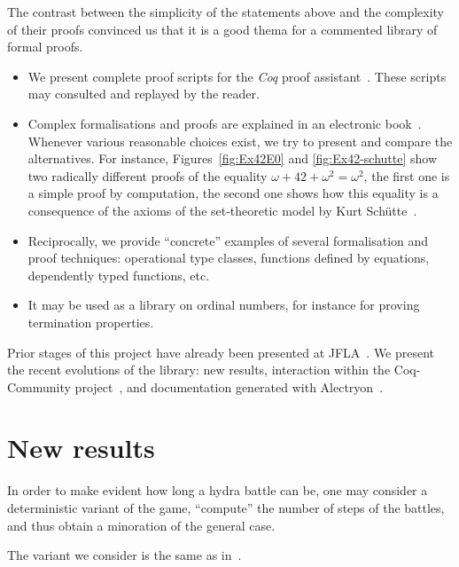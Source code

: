 \documentclass{easychair}
\begin{document}
The contrast between the simplicity of the statements above and the complexity of their proofs convinced us that it is a good thema for a commented library of formal proofs.


\begin{itemize}
\item We present complete proof scripts for the \textit{Coq} proof assistant~\cite{Coq}. These scripts may consulted and replayed by the reader.
\item Complex formalisations and proofs are explained in an
  electronic book~\cite{HydraBook}. Whenever various reasonable choices exist, we try to present and compare the alternatives.
  For instance, Figures~\vref{fig:Ex42E0} and \vref{fig:Ex42-schutte} show two radically different proofs of the equality
  $\omega+42+\omega^2=\omega^2$, the first one is a simple proof by computation, the second one shows how this equality
  is a consequence of the axioms of the set-theoretic model  by Kurt Schütte~\cite{schutte}. 
\item
  Reciprocally, we provide ``concrete'' examples of several formalisation and proof techniques: operational type classes, functions defined by  equations, dependently typed functions, etc.
\item It may be used as a library on ordinal numbers, for instance for proving termination properties.
  \end{itemize}

 Prior stages of this project have already been presented at
 JFLA~\cite{PCiota, JFLA2018paper}.
We present the recent evolutions of the library: new results, interaction within the Coq-Community project~\cite{CoqCommunity}, and documentation generated with Alectryon~\cite{alectryonpaper, alectryongithub}.

\section{New results}
In order to make evident how long a hydra battle can be,
one may consider a deterministic variant of the game,
``compute'' the number of steps of the battles, and thus obtain a minoration of the general case.

The variant we consider is the same as 
in~\cite{KP82, bauer2008, BauerHydra}. 
\end{document}
